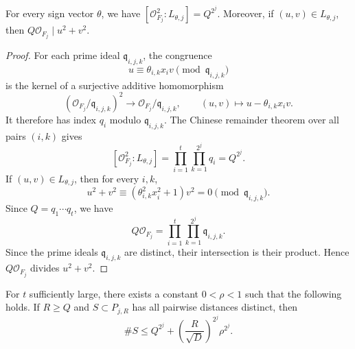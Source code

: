 \begin{lemma}\label{lem:isotropic-subgroups}
For every sign vector \(\theta\), we have \([\mathcal O_{F_j}^2:L_{\theta,j}]=Q^{2^j}\).
Moreover, if \((u,v)\in L_{\theta,j}\), then \(Q\mathcal O_{F_j}\mid u^2+v^2\).
\end{lemma}

\begin{proof}
For each prime ideal \(\mathfrak q_{i,j,k}\), the congruence
\[
u\equiv\theta_{i,k}x_i v\pmod{\mathfrak q_{i,j,k}}
\]
is the kernel of a surjective additive homomorphism
\[
(\mathcal O_{F_j}/\mathfrak q_{i,j,k})^2\to\mathcal O_{F_j}/\mathfrak q_{i,j,k},
\qquad
(u,v)\mapsto u-\theta_{i,k}x_i v.
\]
It therefore has index \(q_i\) modulo \(\mathfrak q_{i,j,k}\).
The Chinese remainder theorem over all pairs \((i,k)\) gives
\[
[\mathcal O_{F_j}^2:L_{\theta,j}]
=
\prod_{i=1}^t\prod_{k=1}^{2^j} q_i
=Q^{2^j}.
\]
If \((u,v)\in L_{\theta,j}\), then for every \(i,k\),
\[
u^2+v^2
\equiv
(\theta_{i,k}^2x_i^2+1)v^2
=0
\pmod{\mathfrak q_{i,j,k}}.
\]
Since \(Q=q_1\cdots q_t\), we have
\[
Q\mathcal O_{F_j}
=
\prod_{i=1}^t\prod_{k=1}^{2^j}\mathfrak q_{i,j,k}.
\]
Since the prime ideals \(\mathfrak q_{i,j,k}\) are distinct, their intersection is their product.
Hence \(Q\mathcal O_{F_j}\) divides \(u^2+v^2\).
\end{proof}

\begin{proposition}\label{prop:sieve}
For \(t\) sufficiently large, there exists a constant \(0<\rho<1\) such that the following holds.
If \(R\ge Q\) and \(S\subset P_{j,R}\) has all pairwise distances distinct, then
\begin{equation}\label{eq:sieve-conclusion}
\#S\le Q^{2^j}+\left(\frac{R}{\sqrt D}\right)^{2^j}\rho^{2^j}.
\end{equation}
\end{proposition}

